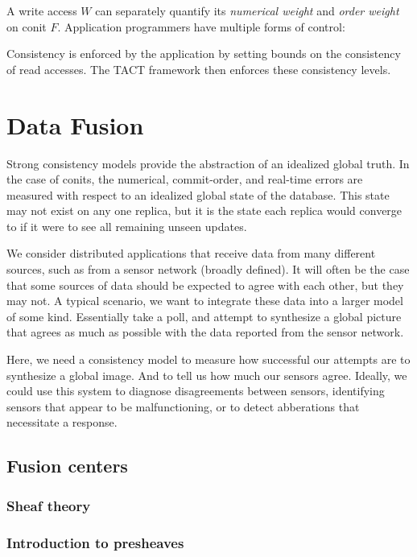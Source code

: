 \documentclass[]             %
{NASA}                       %
\theoremstyle{definition}
\begin{document}
A write access \(W\) can separately quantify its \emph{numerical weight}
and \emph{order weight} on conit \(F\). Application programmers have
multiple forms of control:

Consistency is enforced by the application by setting bounds on the
consistency of read accesses. The TACT framework then enforces these
consistency levels.


\section{Data Fusion}
\label{sec:data-fusion}

\cite{1999:lucien-datafusion}

Strong consistency models provide the abstraction of an idealized global
truth. In the case of conits, the numerical, commit-order, and real-time
errors are measured with respect to an idealized global state of the
database. This state may not exist on any one replica, but it is the
state each replica would converge to if it were to see all remaining
unseen updates.

We consider distributed applications that receive data from many
different sources, such as from a sensor network (broadly defined). It
will often be the case that some sources of data should be expected to
agree with each other, but they may not. A typical scenario, we want to
integrate these data into a larger model of some kind. Essentially take
a poll, and attempt to synthesize a global picture that agrees as much
as possible with the data reported from the sensor network.

Here, we need a consistency model to measure how successful our attempts
are to synthesize a global image. And to tell us how much our sensors
agree. Ideally, we could use this system to diagnose disagreements
between sensors, identifying sensors that appear to be malfunctioning,
or to detect abberations that necessitate a response.

\subsection{Fusion centers}
\label{fusion-centers}

\subsubsection{Sheaf theory}
\label{sheaf-theory}

\subsubsection{Introduction to presheaves}
\label{introduction-to-presheaves}
\end{document}
